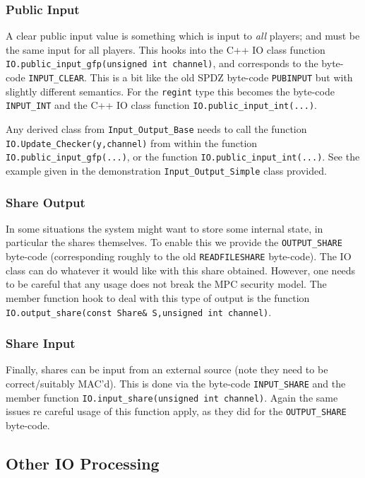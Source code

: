 \subsubsection{Public Input}
A clear public input value is something which is input to
{\em all} players; and must be the same input for all players.
This hooks into the C++ IO class function 
\verb+IO.public_input_gfp(unsigned int channel)+, and corresponds to the byte-code
\verb+INPUT_CLEAR+.
This is a bit like the old SPDZ byte-code \verb+PUBINPUT+
but with slightly different semantics.
For the \verb|regint| type this becomes the byte-code \verb+INPUT_INT+
and the C++ IO class function
\verb+IO.public_input_int(...)+.

Any derived class from \verb+Input_Output_Base+ needs to call
the function \verb+IO.Update_Checker(y,channel)+ from within the
function \verb+IO.public_input_gfp(...)+,
or the function \verb+IO.public_input_int(...)+.
See the example given in the demonstration \verb+Input_Output_Simple+ class provided.

\subsubsection{Share Output}
In some situations the system might want to store some
internal state, in particular the shares themselves.
To enable this we provide the \verb+OUTPUT_SHARE+
byte-code (corresponding roughly to the old 
\verb+READFILESHARE+ byte-code). The IO class can do
whatever it would like with this share obtained. However,
one needs to be careful that any usage does not break the
MPC security model.
The member function hook to deal with this type of
output is the function
\verb+IO.output_share(const Share& S,unsigned int channel)+.

\subsubsection{Share Input}
Finally, shares can be input from an external source
(note they need to be correct/suitably MAC'd). This
is done via the byte-code \verb+INPUT_SHARE+ and the
member function \verb+IO.input_share(unsigned int channel)+.
Again the same issues re careful usage of this function
apply, as they did for the \verb+OUTPUT_SHARE+ byte-code.


\subsection{Other IO Processing}

